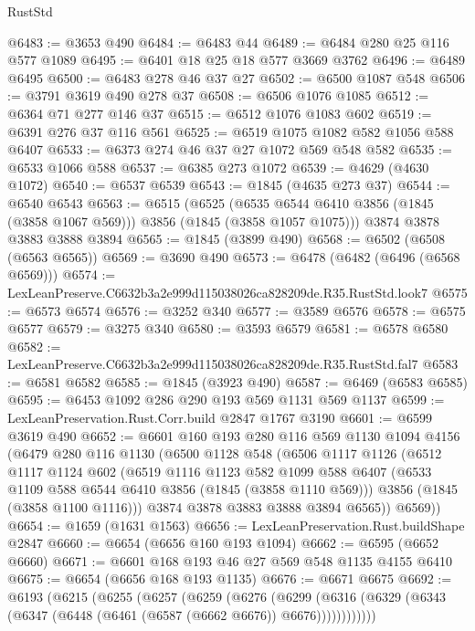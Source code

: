 \begin{lexlean}{RustStd}
\begin{coremodule}
@6483 := @3653 @490
@6484 := @6483 @44
@6489 := @6484 @280 @25 @116 @577 @1089
@6495 := @6401 @18 @25 @18 @577 @3669 @3762
@6496 := @6489 @6495
@6500 := @6483 @278 @46 @37 @27
@6502 := @6500 @1087 @548
@6506 := @3791 @3619 @490 @278 @37
@6508 := @6506 @1076 @1085
@6512 := @6364 @71 @277 @146 @37
@6515 := @6512 @1076 @1083 @602
@6519 := @6391 @276 @37 @116 @561
@6525 := @6519 @1075 @1082 @582 @1056 @588 @6407
@6533 := @6373 @274 @46 @37 @27 @1072 @569 @548 @582
@6535 := @6533 @1066 @588
@6537 := @6385 @273 @1072
@6539 := @4629 (@4630 @1072)
@6540 := @6537 @6539
@6543 := @1845 (@4635 @273 @37)
@6544 := @6540 @6543
@6563 := @6515
    (@6525 (@6535 @6544 @6410 @3856 (@1845 (@3858 @1067 @569))) @3856 (@1845 (@3858 @1057 @1075)))
    @3874
    @3878
    @3883
    @3888
    @3894
@6565 := @1845 (@3899 @490)
@6568 := @6502 (@6508 (@6563 @6565))
@6569 := @3690 @490
@6573 := @6478 (@6482 (@6496 (@6568 @6569)))
@6574 := LexLeanPreserve.C6632b3a2e999d115038026ca828209de.R35.RustStd.look7
@6575 := @6573 @6574
@6576 := @3252 @340
@6577 := @3589 @6576
@6578 := @6575 @6577
@6579 := @3275 @340
@6580 := @3593 @6579
@6581 := @6578 @6580
@6582 := LexLeanPreserve.C6632b3a2e999d115038026ca828209de.R35.RustStd.fal7
@6583 := @6581 @6582
@6585 := @1845 (@3923 @490)
@6587 := @6469 (@6583 @6585)
@6595 := @6453 @1092 @286 @290 @193 @569 @1131 @569 @1137
@6599 := LexLeanPreservation.Rust.Corr.build @2847 @1767 @3190
@6601 := @6599 @3619 @490
@6652 := @6601
    @160
    @193
    @280
    @116
    @569
    @1130
    @1094
    @4156
    (@6479
      @280
      @116
      @1130
      (@6500
        @1128
        @548
        (@6506
          @1117
          @1126
          (@6512
            @1117
            @1124
            @602
            (@6519
              @1116
              @1123
              @582
              @1099
              @588
              @6407
              (@6533 @1109 @588 @6544 @6410 @3856 (@1845 (@3858 @1110 @569)))
              @3856
              (@1845 (@3858 @1100 @1116)))
            @3874
            @3878
            @3883
            @3888
            @3894
            @6565))
        @6569))
@6654 := @1659 (@1631 @1563)
@6656 := LexLeanPreservation.Rust.buildShape @2847
@6660 := @6654 (@6656 @160 @193 @1094)
@6662 := @6595 (@6652 @6660)
@6671 := @6601 @168 @193 @46 @27 @569 @548 @1135 @4155 @6410
@6675 := @6654 (@6656 @168 @193 @1135)
@6676 := @6671 @6675
@6692 := @6193
    (@6215
      (@6255
        (@6257
          (@6259
            (@6276
              (@6299
                (@6316 (@6329 (@6343 (@6347 (@6448 (@6461 (@6587 (@6662 @6676)) @6676))))))))))))

\end{coremodule}
\end{lexlean}
